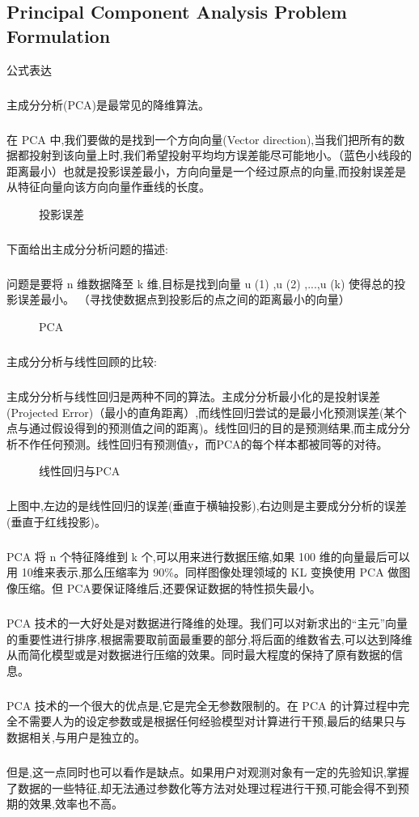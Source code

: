 \documentclass{article}
\begin{document}
\begin{CJK}{UTF8}{gbsn}
\subsection{Principal Component Analysis Problem Formulation}
公式表达
\subparagraph{}
主成分分析(PCA)是最常见的降维算法。
\subparagraph{}
在 PCA 中,我们要做的是找到一个方向向量(Vector direction),当我们把所有的数据都投射到该向量上时,我们希望投射平均均方误差能尽可能地小。（蓝色小线段的距离最小）也就是投影误差最小，方向向量是一个经过原点的向量,而投射误差是从特征向量向该方向向量作垂线的长度。
\begin{figure}[H]
\label{fig:840}
\caption{投影误差}
\end{figure}
\subparagraph{}
下面给出主成分分析问题的描述:
\subparagraph{}
问题是要将 n 维数据降至 k 维,目标是找到向量 u (1) ,u (2) ,...,u (k) 使得总的投影误差最小。
（寻找使数据点到投影后的点之间的距离最小的向量）
\begin{figure}[H]
\label{fig:841}
\caption{PCA}
\end{figure}
\subparagraph{}
主成分分析与线性回顾的比较:
\subparagraph{}
主成分分析与线性回归是两种不同的算法。主成分分析最小化的是投射误差(Projected Error)（最小的直角距离）,而线性回归尝试的是最小化预测误差(某个点与通过假设得到的预测值之间的距离)。线性回归的目的是预测结果,而主成分分析不作任何预测。线性回归有预测值y，而PCA的每个样本都被同等的对待。
\begin{figure}[H]
\label{fig:842}
\caption{线性回归与PCA}
\end{figure}
\subparagraph{}
上图中,左边的是线性回归的误差(垂直于横轴投影),右边则是主要成分分析的误差(垂直于红线投影)。
\begin{figure}[H]
\label{fig:844}
\end{figure}
\begin{figure}[H]
\label{fig:845}
\end{figure}
\subparagraph{}
PCA 将 n 个特征降维到 k 个,可以用来进行数据压缩,如果 100 维的向量最后可以用 10维来表示,那么压缩率为 90\%{}。同样图像处理领域的 KL 变换使用 PCA 做图像压缩。但 PCA要保证降维后,还要保证数据的特性损失最小。
\subparagraph{}
PCA 技术的一大好处是对数据进行降维的处理。我们可以对新求出的“主元”向量的重要性进行排序,根据需要取前面最重要的部分,将后面的维数省去,可以达到降维从而简化模型或是对数据进行压缩的效果。同时最大程度的保持了原有数据的信息。
\subparagraph{}
PCA 技术的一个很大的优点是,它是完全无参数限制的。在 PCA 的计算过程中完全不需要人为的设定参数或是根据任何经验模型对计算进行干预,最后的结果只与数据相关,与用户是独立的。
\subparagraph{}
但是,这一点同时也可以看作是缺点。如果用户对观测对象有一定的先验知识,掌握了数据的一些特征,却无法通过参数化等方法对处理过程进行干预,可能会得不到预期的效果,效率也不高。

\end{CJK}
\end{document}

